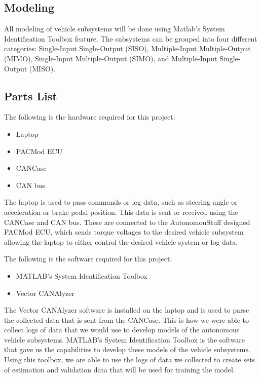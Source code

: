 \documentclass[letterpaper,12pt]{article}   %
\begin{document}
 \subsection{Modeling} \label{sec:model}
 All modeling of vehicle subsystems will be done using Matlab's System Identification Toolbox feature. The subsystems can be grouped into four different categories: Single-Input Single-Output (SISO), Multiple-Input Multiple-Output (MIMO), Single-Input Multiple-Output (SIMO), and Multiple-Input Single-Output (MISO).
 
 \subsection{Parts List}
	The following is the hardware required for this project:  
	\begin{itemize}
    		\item Laptop
    		\item PACMod ECU
    		\item CANCase 
    		\item CAN bus 
 	\end{itemize}
	The laptop is used to pass commands or log data, such as steering angle or acceleration or brake pedal position. This data is sent or received using the CANCase and CAN bus. These are connected to the AutonomouStuff designed PACMod ECU, which sends torque voltages to the desired vehicle subsystem allowing the laptop to either control the desired vehicle system or log data.\bigskip

	The following is the software required for this project: 
	\begin{itemize}
    		\item MATLAB's System Identification Toolbox 
    		\item Vector CANAlyzer 
 	\end{itemize}
 	The Vector CANAlyzer software is installed on the laptop and is used to parse the collected data that is sent from the CANCase. This is how we were able to collect logs of data that we would use to develop models of the autonomous vehicle subsystems. MATLAB's System Identification Toolbox is the software that gave us the capabilities to develop these models of the vehicle subsystems. Using this toolbox, we are able to use the logs of data we collected to create sets of estimation and validation data that will be used for training the model.
\end{document}

